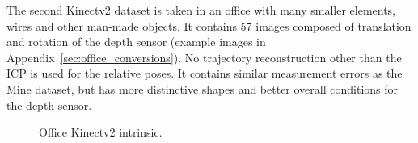The second Kinectv2 dataset is taken in an office with many smaller elements, wires and other man-made objects.
It contains 57 images composed of translation and rotation of the depth sensor (example images in Appendix~\ref{sec:office_conversions}).
No trajectory reconstruction other than the ICP is used for the relative poses.
It contains similar measurement errors as the Mine dataset, but has more distinctive shapes and better overall conditions for the depth sensor.
\begin{figure}[H]
\CenterFloatBoxes%
\begin{floatrow}
    {\caption{Office Kinectv2 intrinsic.}\label{tab:office_intrinsic}}%
\end{floatrow}
\end{figure}

